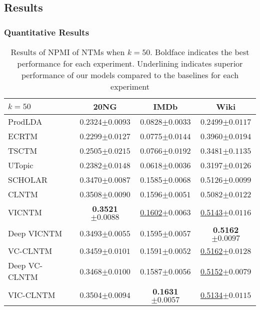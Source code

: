 \documentclass{article}
\begin{document}
\subsection{Results}\label{sec44}
\subsubsection{Quantitative Results}
\begin{table*}[ht]
\centering
\caption{Results of NPMI of NTMs when $k=50$. Boldface indicates the best performance for each experiment. Underlining indicates superior performance of our models compared to the baselines for each experiment}
\label{tab:results50}
\begin{tabular*}{\textwidth}{@{\extracolsep\fill}lccc}
    \hline
    $k=50$              & 20NG                   & IMDb                    & Wiki                    \\ \hline
    ProdLDA       & 0.2324{\tiny $\pm0.0093$}          & 0.0828{\tiny $\pm0.0033$}           & 0.2499{\tiny $\pm0.0117$}           \\
    ECRTM         & 0.2299{\tiny $\pm0.0127$}          & 0.0775{\tiny $\pm0.0144$}           & 0.3960{\tiny $\pm0.0194$}           \\
    TSCTM         & 0.2505{\tiny $\pm0.0215$}          & 0.0766{\tiny $\pm0.0192$}           & 0.3481{\tiny $\pm0.1135$}           \\
    UTopic        & 0.2382{\tiny $\pm0.0148$}          & 0.0618{\tiny $\pm0.0036$}           & 0.3197{\tiny $\pm0.0126$}           \\
    SCHOLAR       & 0.3470{\tiny $\pm0.0087$}          & 0.1585{\tiny $\pm0.0068$}           & 0.5126{\tiny $\pm0.0099$}           \\
    CLNTM         & 0.3508{\tiny $\pm0.0090$}          & 0.1596{\tiny $\pm0.0051$}           & 0.5082{\tiny $\pm0.0122$}           \\ \hline
    VICNTM        & {\bf 0.3521{\tiny $\pm0.0088$}} & \underline{0.1602}{\tiny $\pm0.0063$} & \underline{0.5143}{\tiny $\pm0.0116$} \\
    Deep VICNTM   & 0.3493{\tiny $\pm0.0055$}          & 0.1595{\tiny $\pm0.0057$}           & {\bf0.5162{\tiny $\pm0.0097$}}  \\
    VC-CLNTM      & 0.3459{\tiny $\pm0.0101$}          & 0.1591{\tiny $\pm0.0052$}           & \underline{0.5162}{\tiny $\pm0.0128$} \\
    Deep VC-CLNTM & 0.3468{\tiny $\pm0.0100$}          & 0.1587{\tiny $\pm0.0056$}           & \underline{0.5152}{\tiny $\pm0.0079$} \\
    VIC-CLNTM     & 0.3504{\tiny $\pm0.0094$}          & {\bf 0.1631{\tiny $\pm0.0057$}}  & \underline{0.5134}{\tiny $\pm0.0115$}           \\ \hline
    \end{tabular*}

\end{table*}
\end{document}
